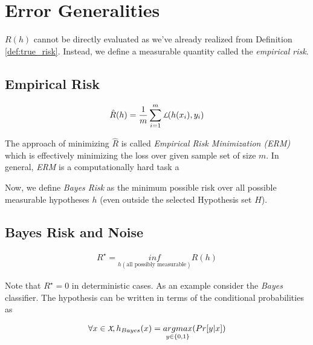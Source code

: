 \documentclass[../main]{subfiles}
\begin{document}
\section{Error Generalities}

$R(h)$ cannot be directly evaluated as we've already realized from Definition
\ref{def:true_risk}. Instead, we define a measurable quantity called the \textit{empirical 
risk}.

\subsection{Empirical Risk}

\begin{definition} \label{def:emp_risk}
\begin{align}
\hat{R}(h) = \frac{1}{m} \sum_{i=1}^{m} \cursive{L}(h(x_i),y_i)
\end{align}
\end{definition}

The approach of minimizing $\hat{R}$ is called \textit{Empirical Risk Minimization (ERM)}
which is effectively minimizing the loss over given sample set of size $m$. In general, 
\textit{ERM} is a computationally hard task a

Now, we define \textit{Bayes Risk} as the minimum possible risk over all possible
measurable hypotheses $h$ (even outside the selected Hypothesis set $H$).

\subsection{Bayes Risk and Noise}

\begin{definition} \label{def:bayes_risk}
\begin{align}
R^\star = \underset{h (\text{all possibly measurable})}{inf} R(h)
\end{align}
\end{definition}

Note that $R^\star = 0$ in deterministic cases. As an example consider the \textit{Bayes}
classifier. The hypothesis can be written in terms of the conditional probabilities as

\begin{definition} \label{def:bayes_hypothesis}
\begin{align}
\forall x \in \cursive{X}, h_{Bayes}(x) = \underset{y\in\{0,1\}}{argmax} (Pr[y|x])
\end{align}
\end{definition}
\end{document}
